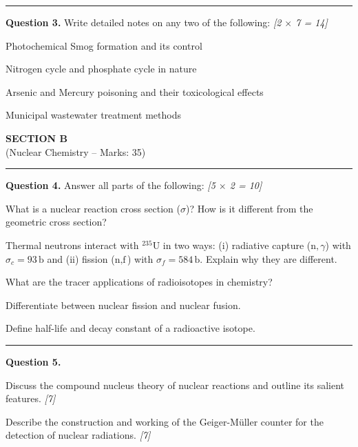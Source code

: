 \documentclass[11pt,a4paper]{article}
\newcommand{\pts}[1]{\hfill   \textit{[#1]}}
\begin{document}
\medskip\rule{\linewidth}{0.2pt}




\noindent   \textbf{Question 3.} Write detailed notes on any two of the following: \pts{2 $ \times$ 7 = 14}

\begin{parts}
  \item Photochemical Smog formation and its control
  \item Nitrogen cycle and phosphate cycle in nature
  \item Arsenic and Mercury poisoning and their toxicological effects
  \item Municipal wastewater treatment methods
\end{parts}


\newpage

\begin{center}
  {\large\bfseries SECTION B}\\[2pt]
  {\normalsize (Nuclear Chemistry -- Marks: 35)}
\end{center}
\rule{0.4\linewidth}{0.2pt}
\smallskip




\noindent   \textbf{Question 4.} Answer all parts of the following: \pts{5 $ \times$ 2 = 10}

\begin{parts}
  \item What is a nuclear reaction cross section ($\sigma$)? How is it different from the geometric cross section?
  \item Thermal neutrons interact with $^{235} \text{U}$ in two ways: (i) radiative capture ($ \text{n}, \gamma$) with $\sigma_c = 93\, \text{b}$ and (ii) fission ($ \text{n},  \text{f}$) with $\sigma_f = 584\, \text{b}$. Explain why they are different.
  \item What are the tracer applications of radioisotopes in chemistry?
  \item Differentiate between nuclear fission and nuclear fusion.
  \item Define half-life and decay constant of a radioactive isotope.
\end{parts}

\medskip\rule{\linewidth}{0.2pt}




\noindent   \textbf{Question 5.}

\begin{parts}
  \item Discuss the compound nucleus theory of nuclear reactions and outline its salient features. \pts{7}
  \item Describe the construction and working of the Geiger-M\"uller counter for the detection of nuclear radiations. \pts{7}
\end{parts}
\end{document}
